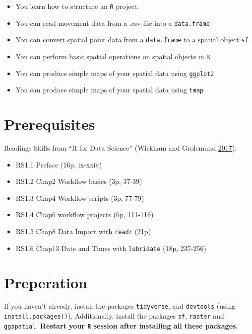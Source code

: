 \documentclass[]{book}
\providecommand{\tightlist}{%
  \setlength{\itemsep}{0pt}\setlength{\parskip}{0pt}}
\begin{document}
\begin{itemize}
\tightlist
\item
  You learn how to structure an \texttt{R} project.
\item
  You can read movement data from a .csv-file into a \texttt{data.frame}
\item
  You can convert spatial point data from a \texttt{data.frame} to a spatial object \texttt{sf}
\item
  You can perform basic spatial operations on spatial objects in \texttt{R}
\item
  You can produce simple maps of your spatial data using \texttt{ggplot2}
\item
  You can produce simple maps of your spatial data using \texttt{tmap}
\end{itemize}

\hypertarget{prerequisites}{%
\section{Prerequisites}\label{prerequisites}}

Readings Skills from ``R for Data Science'' (Wickham and Grolemund \protect\hyperlink{ref-wickham2017}{2017}):

\begin{itemize}
\tightlist
\item
  RS1.1 Preface (16p, ix-xxiv)
\item
  RS1.2 Chap2 Workflow basics (3p, 37-39)
\item
  RS1.3 Chap4 Workflow scripts (3p, 77-79)
\item
  RS1.4 Chap6 workflow projects (6p, 111-116)
\item
  RS1.5 Chap8 Data Import with \texttt{readr} (21p)
\item
  RS1.6 Chap13 Date and Times with \texttt{lubridate} (18p, 237-256)
\end{itemize}

\hypertarget{preperation}{%
\section{Preperation}\label{preperation}}

If you haven't already, install the packages \texttt{tidyverse}, and \texttt{devtools} (using \texttt{install.packages()}). Additionally, install the packages \texttt{sf}, \texttt{raster} and \texttt{ggspatial}. \textbf{Restart your \texttt{R} session after installing all these packages.}
\end{document}
